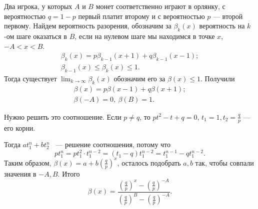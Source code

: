  \begin{example}

   Два игрока, у которых $A$ и $B$ монет соответственно играют в орлянку, с вероятностью $q=1-p$ первый платит второму и с вероятностью $p$
     --- второй первому.
     Найдем вероятность разорения, обозначим за $\beta_k(x)$ вероятность на $k$-ом шаге
     оказаться в $B$, если на нулевом шаге мы находимся в точке $x$, $-A < x < B$.
     \begin{gather*}
         \beta_k(x) = p\beta_{k - 1}(x + 1) + q\beta_{k -1}(x-1);\\
         \beta_{k - 1}(x) \le \beta_k(x) \le 1.
     \end{gather*}
    Тогда существует 
    $\lim_{k\rightarrow\infty}\beta_k(x)$ обозначим его за $\beta(x) \le 1.$
     Получили
     \begin{gather*}
         \beta(x) = p\beta(x - 1) + q\beta(x +1);\\
         \beta(-A) = 0, \ \beta(B) = 1.
     \end{gather*}

     Нужно решить это соотношение.
     Если $p\neq q$, то $pt^2 - t + q = 0$, $t_1 = 1, t_2 = \frac{q}{p}$ ---  его корни.

     Тогда $at_1^n + bt_2^n$ ~--- решение соотношения, потому что 
     $$pt_1^n = pt_1^2\cdot t_1^{n - 2} =
         (t_1 - q)t_1^{n - 2} = t_1^{n - 1} - qt_1^{n - 2}.$$
    Таким образом,
     $\beta(x) = a + b(\frac{q}{p})^x$, осталось подобрать $a, b$ так, чтобы совпали значения в $-A, B$. Итого $$\beta(x) = \frac{(\frac{q}{p})^x - (\frac{q}{p})^{-A}}{(\frac{q}{p})^B - (\frac{q}{p})^{-A}}.$$
    
 \end{example}

